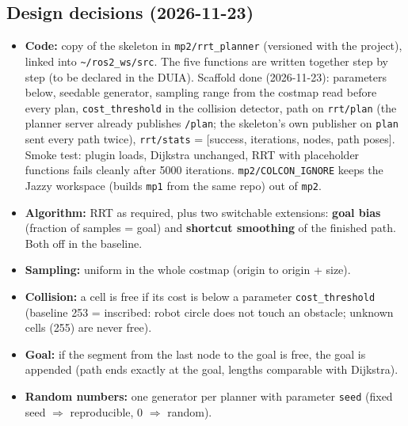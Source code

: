 \documentclass[10pt]{article}
\newcommand{\pkg}[1]{\texttt{#1}}
\begin{document}
\subsection{Design decisions (2026-11-23)}
\begin{itemize}
  \item \textbf{Code:} copy of the skeleton in \pkg{mp2/rrt\_planner} (versioned with the project), linked into
        \pkg{\textasciitilde/ros2\_ws/src}. The five functions are written together step by step (to be declared in the DUIA).
        Scaffold done (2026-11-23): parameters below, seedable generator, sampling range from the costmap read
        before every plan, \pkg{cost\_threshold} in the collision detector, path on \pkg{rrt/plan} (the planner server
        already publishes \pkg{/plan}; the skeleton's own publisher on \pkg{plan} sent every path twice),
        \pkg{rrt/stats} = [success, iterations, nodes, path poses]. Smoke test: plugin loads, Dijkstra unchanged,
        RRT with placeholder functions fails cleanly after 5000 iterations. \pkg{mp2/COLCON\_IGNORE} keeps the Jazzy
        workspace (builds \pkg{mp1} from the same repo) out of \pkg{mp2}.
  \item \textbf{Algorithm:} RRT as required, plus two switchable extensions: \textbf{goal bias} (fraction of samples
        = goal) and \textbf{shortcut smoothing} of the finished path. Both off in the baseline.
  \item \textbf{Sampling:} uniform in the whole costmap (origin to origin + size).
  \item \textbf{Collision:} a cell is free if its cost is below a parameter \pkg{cost\_threshold} (baseline 253 =
        inscribed: robot circle does not touch an obstacle; unknown cells (255) are never free).
  \item \textbf{Goal:} if the segment from the last node to the goal is free, the goal is appended (path ends exactly at
        the goal, lengths comparable with Dijkstra).
  \item \textbf{Random numbers:} one generator per planner with parameter \pkg{seed} (fixed seed $\Rightarrow$
        reproducible, 0 $\Rightarrow$ random).
\end{itemize}
\end{document}
